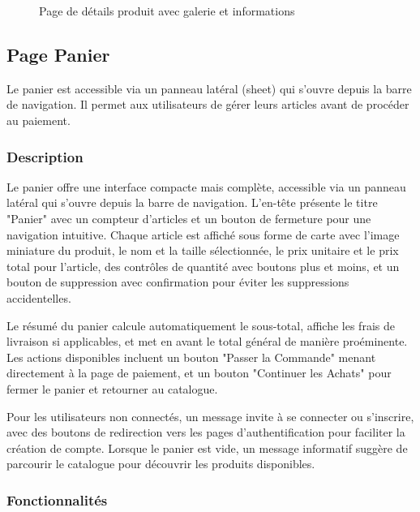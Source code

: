\documentclass[12pt,a4paper]{article}
\begin{document}
\begin{figure}[H]
    \centering
    \caption{Page de détails produit avec galerie et informations}
    \label{fig:product-details}
\end{figure}

\subsection{Page Panier}

Le panier est accessible via un panneau latéral (sheet) qui s'ouvre depuis la barre de navigation. Il permet aux utilisateurs de gérer leurs articles avant de procéder au paiement.

\subsubsection{Description}

Le panier offre une interface compacte mais complète, accessible via un panneau latéral qui s'ouvre depuis la barre de navigation. L'en-tête présente le titre "Panier" avec un compteur d'articles et un bouton de fermeture pour une navigation intuitive. Chaque article est affiché sous forme de carte avec l'image miniature du produit, le nom et la taille sélectionnée, le prix unitaire et le prix total pour l'article, des contrôles de quantité avec boutons plus et moins, et un bouton de suppression avec confirmation pour éviter les suppressions accidentelles.

Le résumé du panier calcule automatiquement le sous-total, affiche les frais de livraison si applicables, et met en avant le total général de manière proéminente. Les actions disponibles incluent un bouton "Passer la Commande" menant directement à la page de paiement, et un bouton "Continuer les Achats" pour fermer le panier et retourner au catalogue.

Pour les utilisateurs non connectés, un message invite à se connecter ou s'inscrire, avec des boutons de redirection vers les pages d'authentification pour faciliter la création de compte. Lorsque le panier est vide, un message informatif suggère de parcourir le catalogue pour découvrir les produits disponibles.

\subsubsection{Fonctionnalités}
\end{document}
